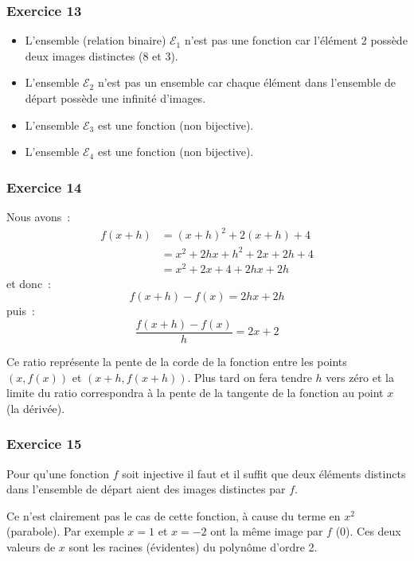 \documentclass[10pt,notheorems]{beamer}
\theoremstyle{plain}
\theoremstyle{definition} %
\begin{document}
\begin{frame}
  \frametitle{Exercice 13}
  \fontsize{8}{10}\selectfont


  \begin{itemize}
  \item L'ensemble (relation binaire) $\mathcal E_1$ n'est pas une fonction car l'élément 2 possède deux images distinctes (8 et 3).\newline
  \item L'ensemble $\mathcal E_2$ n'est pas un ensemble car chaque élément dans l'ensemble de départ possède une infinité d'images.\newline
  \item L'ensemble $\mathcal E_3$ est une fonction (non bijective).\newline
  \item L'ensemble $\mathcal E_4$ est une fonction (non bijective).
    
  \end{itemize}
  
\end{frame}


\begin{frame}
  \frametitle{Exercice 14}
  \fontsize{8}{10}\selectfont


  Nous avons~:
  \[
    \begin{split}
      f(x+h) &= (x+h)^2 + 2(x+h) + 4\\
      &= x^2+2hx+h^2+2x+2h+4\\
      &=x^2+2x+4+2hx+2h
    \end{split}
  \]
  et donc~:
  \[
    f(x+h)-f(x) = 2hx + 2h 
  \]
  puis~:
  \[
    \frac{f(x+h)-f(x)}{h} = 2x + 2
  \]

  \bigskip
  
  Ce ratio représente la pente de la corde de la fonction entre les points $(x, f(x))$ et $(x+h, f(x+h))$. Plus tard on fera tendre $h$ vers zéro et la limite du ratio correspondra à la pente de la tangente de la fonction au point $x$ (la dérivée).
    
\end{frame}


\begin{frame}
  \frametitle{Exercice 15}
  \fontsize{8}{10}\selectfont

  Pour qu'une fonction $f$ soit injective il faut et il suffit que deux éléments distincts dans l'ensemble de départ aient des images distinctes par $f$.\newline

  Ce n'est clairement pas le cas de cette fonction, à cause du terme en $x^2$ (parabole). Par exemple $x=1$ et $x=-2$ ont la même image par $f$ (0). Ces deux valeurs de $x$ sont les racines (évidentes) du polynôme d'ordre 2. 

\end{frame}
\end{document}
